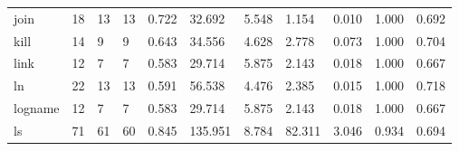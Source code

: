\begin{longtable}{lp{1.2cm}p{1.2cm}p{1.2cm}p{1.2cm}p{1.2cm}p{1.2cm}p{1.2cm}p{1.2cm}p{1.2cm}p{1.2cm}}
join      &                           18 &                 13 &                                13 &                                      0.722 &                                 32.692 &                                        5.548 &                             1.154 &                                   0.010 &                              1.000 &                                              0.692 \\
kill      &                           14 &                  9 &                                 9 &                                      0.643 &                                 34.556 &                                        4.628 &                             2.778 &                                   0.073 &                              1.000 &                                              0.704 \\
link      &                           12 &                  7 &                                 7 &                                      0.583 &                                 29.714 &                                        5.875 &                             2.143 &                                   0.018 &                              1.000 &                                              0.667 \\
ln        &                           22 &                 13 &                                13 &                                      0.591 &                                 56.538 &                                        4.476 &                             2.385 &                                   0.015 &                              1.000 &                                              0.718 \\
logname   &                           12 &                  7 &                                 7 &                                      0.583 &                                 29.714 &                                        5.875 &                             2.143 &                                   0.018 &                              1.000 &                                              0.667 \\
ls        &                           71 &                 61 &                                60 &                                      0.845 &                                135.951 &                                        8.784 &                            82.311 &                                   3.046 &                              0.934 &                                              0.694 \\

\end{longtable}
